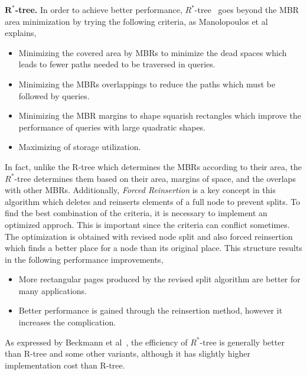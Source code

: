 \documentclass[a4paper,12pt]{article}
\begin{document}
\textbf{$\boldsymbol{R^*}$-tree.}
In order to achieve better performance, $R^*$-tree~\cite{rstartree} goes beyond the MBR area minimization by trying the following criteria, as Manolopoulos et al~\cite{Manolopoulos:2005} explains,
\begin{itemize}
\item Minimizing the covered area by MBRs to minimize the dead spaces which leads to fewer paths needed to be traversed in queries. 
\item Minimizing the MBRs overlappings to reduce the paths which must be followed by queries.
\item Minimizing the MBR margins to shape squarish rectangles which improve the performance of queries with large quadratic shapes.
\item Maximizing of storage utilization. 
\end{itemize}
In fact, unlike the R-tree which determines the MBRs according to their area, the $R^*$-tree determines them based on their area, margins of space, and the overlaps with other MBRs. Additionally, \textit{Forced Reinsertion} is a key concept in this algorithm which deletes and reinserts elements of a full node to prevent splits.
To find the best combination of the criteria, it is necessary to implement an optimized approch. This is important since the criteria can conflict sometimes. The optimization is obtained with revised node split and also forced reinsertion which finds a better place for a node than its original place. This structure results in the following performance improvements,
\begin{itemize}
\item More rectangular pages produced by the revised split algorithm are better for many applications.
\item Better performance is gained through the reinsertion method, however it increases the complication.
\end{itemize}
As expressed by Beckmann et al~\cite{rstartree}, the efficiency of $R^*$-tree is generally better than R-tree and some other variants, although it has slightly higher implementation cost than R-tree.
\end{document}

